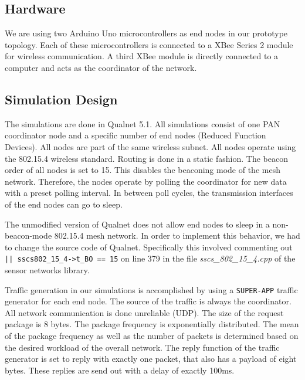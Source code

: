 \subsection{Hardware}
We are using two Arduino Uno microcontrollers as end nodes in our prototype topology. Each of these microcontrollers is connected to a XBee Series 2 module for wireless communication. A third XBee module is directly connected to a computer and acts as the coordinator of the network.


\subsection{Simulation Design}

The simulations are done in Qualnet 5.1. All simulations consist of one PAN coordinator node and a specific number of end nodes (Reduced Function Devices). All nodes are part of the same wireless subnet. All nodes operate using the 802.15.4 wireless standard. Routing is done in a static fashion. The beacon order of all nodes is set to 15. This disables the beaconing mode of the mesh network. Therefore, the nodes operate by polling the coordinator for new data with a preset polling interval. In between poll cycles, the transmission interfaces of the end nodes can go to sleep.

The unmodified version of Qualnet does not allow end nodes to sleep in a non-beacon-mode 802.15.4 mesh network. In order to implement this behavior, we had to change the source code of Qualnet. Specifically this involved commenting out \texttt{|| sscs802\_15\_4->t\_BO == 15} on line 379 in the file \textit{sscs\_802\_15\_4.cpp} of the sensor networks library.

Traffic generation in our simulations is accomplished by using a \texttt{SUPER-APP} traffic generator for each end node. The source of the traffic is always the coordinator. All network communication is done unreliable (UDP). The size of the request package is 8 bytes. The package frequency is exponentially distributed. The mean of the package frequency as well as the number of packets is determined based on the desired workload of the overall network. The reply function of the traffic generator is set to reply with exactly one packet, that also has a payload of eight bytes. These replies are send out with a delay of exactly 100ms.



